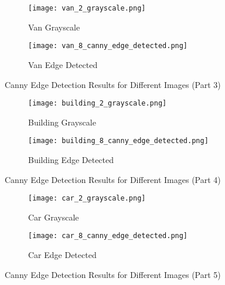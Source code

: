 \begin{figure}[ht]\ContinuedFloat
    \centering
    \begin{subfigure}{0.4\textwidth}
        \centering
        \texttt{[image: van\_2\_grayscale.png]}
        \caption{Van Grayscale}
        \label{fig:van_grayscale}
    \end{subfigure}
    \begin{subfigure}{0.4\textwidth}
        \centering
        \texttt{[image: van\_8\_canny\_edge\_detected.png]}
        \caption{Van Edge Detected}
        \label{fig:van_edge_detected}
    \end{subfigure}
    \caption{Canny Edge Detection Results for Different Images (Part 3)}
\end{figure}

\begin{figure}[ht]\ContinuedFloat
    \centering
    \begin{subfigure}{0.4\textwidth}
        \centering
        \texttt{[image: building\_2\_grayscale.png]}
        \caption{Building Grayscale}
        \label{fig:building_grayscale}
    \end{subfigure}
    \hfill
    \begin{subfigure}{0.4\textwidth}
        \centering
        \texttt{[image: building\_8\_canny\_edge\_detected.png]}
        \caption{Building Edge Detected}
        \label{fig:building_edge_detected}
    \end{subfigure}
    \caption{Canny Edge Detection Results for Different Images (Part 4)}
\end{figure}

\begin{figure}[ht]\ContinuedFloat
    \centering
    \begin{subfigure}{0.4\textwidth}
        \centering
        \texttt{[image: car\_2\_grayscale.png]}
        \caption{Car Grayscale}
        \label{fig:car_grayscale}
    \end{subfigure}
    \hfill
    \begin{subfigure}{0.4\textwidth}
        \centering
        \texttt{[image: car\_8\_canny\_edge\_detected.png]}
        \caption{Car Edge Detected}
        \label{fig:car_edge_detected}
    \end{subfigure}
    \caption{Canny Edge Detection Results for Different Images (Part 5)}
\end{figure}

